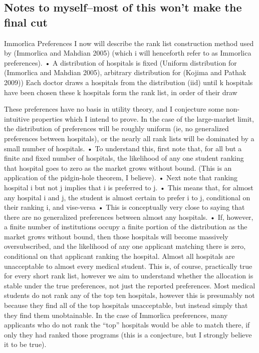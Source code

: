 \documentclass[WP]{AEA}
\begin{document}
\subsection{Notes to myself--most of this won't make the final cut}
Immorlica Preferences
I now will describe the rank list construction method used by (Immorlica and Mahdian 2005) (which i will henceforth refer to as Immorlica preferences). 
•	A distribution of hospitals is fixed (Uniform distribution for (Immorlica and Mahdian 2005), arbitrary distribution for (Kojima and Pathak 2009))
Each doctor draws a hospitals from the distribution (iid) until k hospitals have been chosen
these k hospitals form the rank list, in order of their draw

These preferences have no basis in utility theory, and I conjecture some non-intuitive properties which I intend to prove.	
In the case of the large-market limit, the distribution of preferences will be roughly uniform (ie, no generalized preferences between hospitals), or the nearly all rank lists will be dominated by a small number of hospitals.
•	To understand this, first note that, for all but a finite and fixed number of hospitals, the likelihood of any one student ranking that hospital goes to zero as the market grows without bound. (This is an application of the pidgin-hole theorem, I believe).
•	Next note that ranking hospital i but not j implies that i is preferred to j.  
•	This means that, for almost any hospital i and j, the student is almost certain to prefer i to j, conditional on their ranking i, and vise-versa
•	This is conceptually very close to saying that there are no generalized preferences between almost any hospitals.
•	If, however, a finite number of institutions occupy a finite portion of the distribution as the market grows without bound, then those hospitals will become massively oversubscribed, and the likelihood of any one applicant matching there is zero, conditional on that applicant ranking the hospital.
Almost all hospitals are unacceptable to almost every medical student.  This is, of course, practically true for every short rank list, however we aim to understand whether the allocation is stable under the true preferences, not just the reported preferences.  Most medical students do not rank any of the top ten hospitals, however this is presumably not because they find all of the top hospitals unacceptable, but instead simply that they find them unobtainable.  In the case of Immorlica preferences, many applicants who do not rank the “top” hospitals would be able to match there, if only they had ranked those programs (this is a conjecture, but I strongly believe it to be true).
\end{document}

